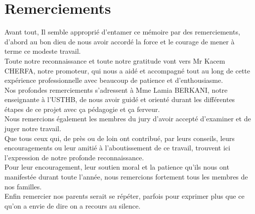 \documentclass{report}
\begin{document}
 


\renewcommand{\contentsname}{Sommaire}
\tableofcontents



\chapter*{Remerciements}
\Large
Avant tout, Il semble approprié d'entamer ce mémoire par des remerciements, d’abord au bon dieu de nous avoir accordé la force et le courage de mener à terme ce modeste travail.\\

Toute notre reconnaissance et toute notre gratitude vont vers Mr Kacem CHERFA, notre promoteur, qui nous a aidé et accompagné tout au long de cette expérience professionnelle avec beaucoup de patience et d'enthousiasme.\\

Nos profondes remerciements s’adressent à Mme Lamia BERKANI, notre enseignante à l'USTHB, de nous avoir guidé et orienté durant les différentes étapes de ce projet avec ça pédagogie et ça ferveur.\\

Nous remercions également les membres du jury d’avoir accepté d’examiner et de juger notre travail.\\

Que tous ceux qui, de près ou de loin ont contribué, par leurs conseils, leurs
encouragements ou leur amitié à l’aboutissement de ce travail, trouvent ici
l’expression de notre profonde reconnaissance.\\

Pour leur encouragement, leur soutien moral et la patience qu’ils nous ont
manifestée durant toute l’année, nous remercions fortement tous les membres de
nos familles.\\

Enfin remercier nos parents serait se répéter, parfois pour exprimer plus que ce qu’on a envie de dire on a recours au silence.

\normalsize
\end{document}

